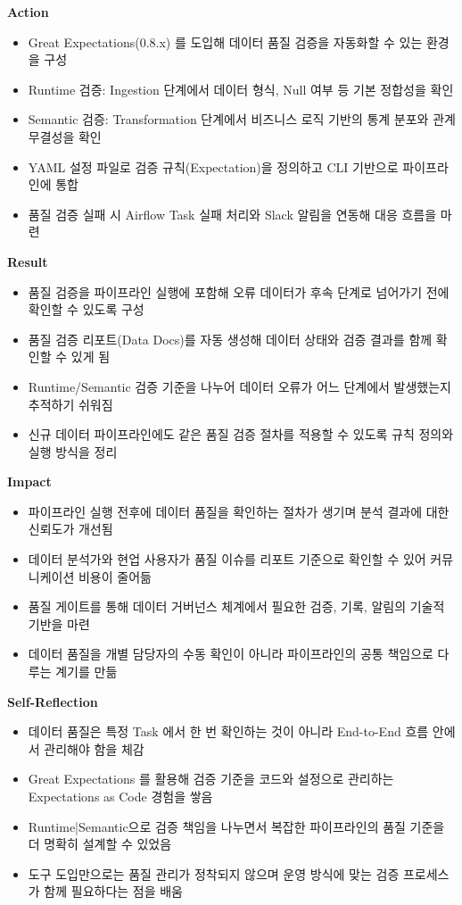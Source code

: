 \documentclass[letterpaper,11pt]{article}
\newcommand{\resumeSubProject}[2]{
  \item{
    {#1 \vspace{0pt}}
    {#2}
  }
}
\newcommand{\resumeSubBulletsStart}{%
  \begin{itemize}[leftmargin=1.5em, itemsep=2pt, topsep=2pt, label=$\circ$]%
}
\newcommand{\resumeSubBulletsEnd}{%
  \end{itemize}\vspace{-4pt}%
}
\begin{document}
  \resumeSubProject{\textbf{Action}}{
    \resumeSubBulletsStart
      \item Great Expectations(0.8.x) 를 도입해 데이터 품질 검증을 자동화할 수 있는 환경을 구성
      \item Runtime 검증: Ingestion 단계에서 데이터 형식, Null 여부 등 기본 정합성을 확인
      \item Semantic 검증: Transformation 단계에서 비즈니스 로직 기반의 통계 분포와 관계 무결성을 확인
      \item YAML 설정 파일로 검증 규칙(Expectation)을 정의하고 CLI 기반으로 파이프라인에 통합
      \item 품질 검증 실패 시 Airflow Task 실패 처리와 Slack 알림을 연동해 대응 흐름을 마련
    \resumeSubBulletsEnd
  }

  \resumeSubProject{\textbf{Result}}{%
    \resumeSubBulletsStart
      \item 품질 검증을 파이프라인 실행에 포함해 오류 데이터가 후속 단계로 넘어가기 전에 확인할 수 있도록 구성
      \item 품질 검증 리포트(Data Docs)를 자동 생성해 데이터 상태와 검증 결과를 함께 확인할 수 있게 됨
      \item Runtime/Semantic 검증 기준을 나누어 데이터 오류가 어느 단계에서 발생했는지 추적하기 쉬워짐
      \item 신규 데이터 파이프라인에도 같은 품질 검증 절차를 적용할 수 있도록 규칙 정의와 실행 방식을 정리
    \resumeSubBulletsEnd
  }

  \resumeSubProject{\textbf{Impact}}{%
    \resumeSubBulletsStart
      \item 파이프라인 실행 전후에 데이터 품질을 확인하는 절차가 생기며 분석 결과에 대한 신뢰도가 개선됨
      \item 데이터 분석가와 현업 사용자가 품질 이슈를 리포트 기준으로 확인할 수 있어 커뮤니케이션 비용이 줄어듦
      \item 품질 게이트를 통해 데이터 거버넌스 체계에서 필요한 검증, 기록, 알림의 기술적 기반을 마련
      \item 데이터 품질을 개별 담당자의 수동 확인이 아니라 파이프라인의 공통 책임으로 다루는 계기를 만듦
    \resumeSubBulletsEnd
  }

  \resumeSubProject{\textbf{Self-Reflection}}{
    \resumeSubBulletsStart
      \item 데이터 품질은 특정 Task 에서 한 번 확인하는 것이 아니라 End-to-End 흐름 안에서 관리해야 함을 체감
      \item Great Expectations 를 활용해 검증 기준을 코드와 설정으로 관리하는 Expectations as Code 경험을 쌓음
      \item Runtime|Semantic으로 검증 책임을 나누면서 복잡한 파이프라인의 품질 기준을 더 명확히 설계할 수 있었음
      \item 도구 도입만으로는 품질 관리가 정착되지 않으며 운영 방식에 맞는 검증 프로세스가 함께 필요하다는 점을 배움
    \resumeSubBulletsEnd
  }
\end{document}
